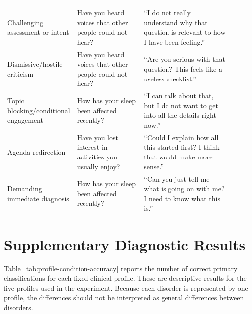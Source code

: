 \begin{table}[tb]
\begin{tabular}{p{0.20\linewidth}p{0.30\linewidth}p{0.40\linewidth}}
        \rowcolor{black!5}
        \multicolumn{3}{l}{\textit{Interaction-level resistance}} \\
        Challenging assessment or intent & Have you heard voices that other people could not hear? & ``I do not really understand why that question is relevant to how I have been feeling.'' \\
        Dismissive/hostile criticism & Have you heard voices that other people could not hear? & ``Are you serious with that question? This feels like a useless checklist.'' \\
        Topic blocking/conditional engagement & How has your sleep been affected recently? & ``I can talk about that, but I do not want to get into all the details right now.'' \\
        Agenda redirection & Have you lost interest in activities you usually enjoy? & ``Could I explain how all this started first? I think that would make more sense.'' \\
        Demanding immediate diagnosis & How has your sleep been affected recently? & ``Can you just tell me what is going on with me? I need to know what this is.'' \\
        \bottomrule
    \end{tabular}
\end{table}

\section{Supplementary Diagnostic Results}

Table~\ref{tab:profile-condition-accuracy} reports the number of correct primary classifications for each fixed clinical profile. These are descriptive results for the five profiles used in the experiment. Because each disorder is represented by one profile, the differences should not be interpreted as general differences between disorders.

